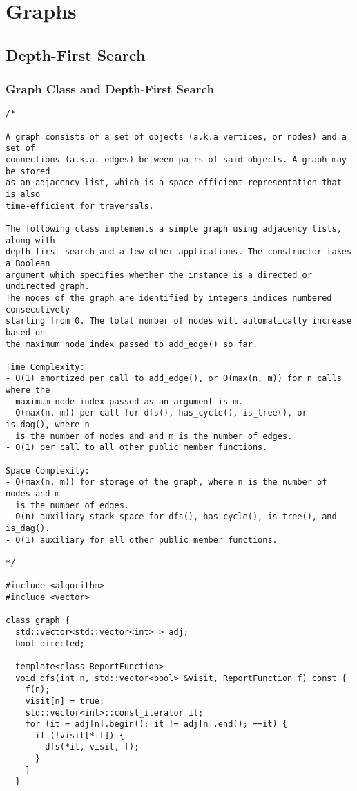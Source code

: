\chapter{Graphs}

\section{Depth-First Search}
\setcounter{section}{1}
\setcounter{subsection}{0}
\subsection{Graph Class and Depth-First Search}
\begin{lstlisting}
/*

A graph consists of a set of objects (a.k.a vertices, or nodes) and a set of
connections (a.k.a. edges) between pairs of said objects. A graph may be stored
as an adjacency list, which is a space efficient representation that is also
time-efficient for traversals.

The following class implements a simple graph using adjacency lists, along with
depth-first search and a few other applications. The constructor takes a Boolean
argument which specifies whether the instance is a directed or undirected graph.
The nodes of the graph are identified by integers indices numbered consecutively
starting from 0. The total number of nodes will automatically increase based on
the maximum node index passed to add_edge() so far.

Time Complexity:
- O(1) amortized per call to add_edge(), or O(max(n, m)) for n calls where the
  maximum node index passed as an argument is m.
- O(max(n, m)) per call for dfs(), has_cycle(), is_tree(), or is_dag(), where n
  is the number of nodes and and m is the number of edges.
- O(1) per call to all other public member functions.

Space Complexity:
- O(max(n, m)) for storage of the graph, where n is the number of nodes and m
  is the number of edges.
- O(n) auxiliary stack space for dfs(), has_cycle(), is_tree(), and is_dag().
- O(1) auxiliary for all other public member functions.

*/

#include <algorithm>
#include <vector>

class graph {
  std::vector<std::vector<int> > adj;
  bool directed;

  template<class ReportFunction>
  void dfs(int n, std::vector<bool> &visit, ReportFunction f) const {
    f(n);
    visit[n] = true;
    std::vector<int>::const_iterator it;
    for (it = adj[n].begin(); it != adj[n].end(); ++it) {
      if (!visit[*it]) {
        dfs(*it, visit, f);
      }
    }
  }


\end{lstlisting}
